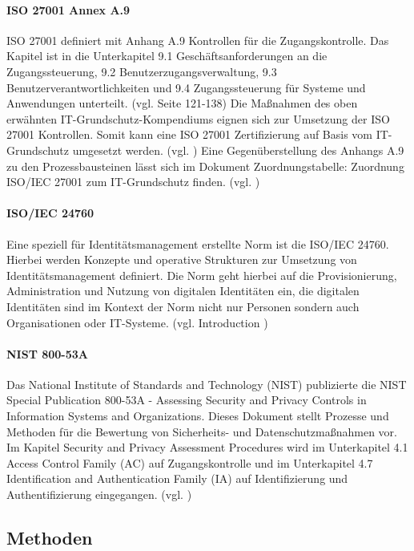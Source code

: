 \documentclass[11pt]{article}
\begin{document}
\paragraph{ISO 27001 Annex A.9}
ISO 27001 definiert mit Anhang A.9 Kontrollen für die Zugangskontrolle. Das Kapitel ist in die Unterkapitel \glqq{}9.1 Geschäftsanforderungen an die Zugangssteuerung\grqq{}, \glqq{}9.2 Benutzerzugangsverwaltung\grqq{}, \glqq{}9.3 Benutzerverantwortlichkeiten\grqq{} und \glqq{}9.4 Zugangssteuerung für Systeme und Anwendungen\grqq{} unterteilt. (vgl. \cite{kersten2020iso27001} Seite 121-138) Die Maßnahmen des oben erwähnten IT-Grundschutz-Kompendiums eignen sich zur Umsetzung der ISO 27001 Kontrollen. Somit kann eine ISO 27001 Zertifizierung auf Basis vom IT-Grundschutz umgesetzt werden. (vgl. \cite{bsi2023iso27001basis}) Eine Gegenüberstellung des Anhangs A.9 zu den Prozessbausteinen lässt sich im Dokument \glqq{}Zuordnungstabelle: Zuordnung ISO/IEC 27001 zum IT-Grundschutz\grqq{} finden. (vgl. \cite{bsi2021map})
\paragraph{ISO/IEC 24760}
Eine speziell für Identitätsmanagement erstellte Norm ist die ISO/IEC 24760. Hierbei werden Konzepte und operative Strukturen zur Umsetzung von Identitätsmanagement definiert. Die Norm geht hierbei auf die Provisionierung, Administration und Nutzung von digitalen Identitäten ein, die digitalen Identitäten sind im Kontext der Norm nicht nur Personen sondern auch Organisationen oder IT-Systeme. (vgl. \cite{iso2019idm} \glqq{}Introduction \grqq{})
\paragraph{NIST 800-53A}
Das National Institute of Standards and Technology (NIST) publizierte die \glqq{}NIST Special Publication 800-53A - Assessing Security and Privacy Controls in Information Systems and Organizations\grqq{}. Dieses Dokument stellt Prozesse und Methoden für die Bewertung von Sicherheits- und Datenschutzmaßnahmen vor. Im Kapitel \glqq{}Security and Privacy Assessment Procedures\grqq{} wird im Unterkapitel 4.1 \glqq{}Access Control Family (AC)\grqq{} auf Zugangskontrolle und im Unterkapitel 4.7 \glqq{}Identification and Authentication Family (IA)\grqq{} auf Identifizierung und Authentifizierung eingegangen. (vgl. \cite{nist202280053a})
\subsection{Methoden}
\end{document}
